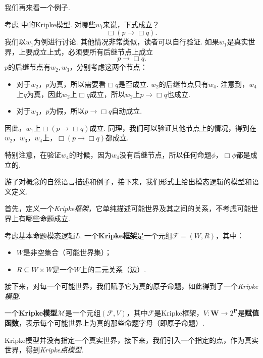 我们再来看一个例子. 

\begin{example}\label{ex:kripke-model-basic}
考虑 中的Kripke模型. 对哪些$w_i$来说，下式成立？
\[\Box (p\to\Box q).\]
我们以$w_1$为例进行讨论. 其他情况非常类似，读者可以自行验证. 如果$w_1$是真实世界，上要成立上式，必须要所有后继节点上成立
    \[p\to\Box q.\]
$p$的后继节点有$w_2,w_3$，分别考虑这两个节点：
\begin{itemize}
    \item 对于$w_2$，$p$为真，所以需要看$\Box q$是否成立. $w_2$的后继节点只有$w_4$. 注意到，$w_4$上$q$为真，因此$w_2$上$\Box q$成立，所以$w_2$上$p\to\Box q$也成立. 
    \item 对于$w_3$，$p$为假，所以$p\to\Box q$自动成立. 
\end{itemize}
因此，$w_1$上$\Box (p\to\Box q)$成立. 同理，我们可以验证其他节点上的情况，得到在$w_2$，$w_3$，$w_4$上，$\Box (p\to\Box q)$都成立. 

特别注意，在验证$w_4$的时候，因为$w_4$没有后继节点，所以任何命题$\phi$，$\Box\phi$都是成立的. 
\end{example}

游了对概念的自然语言描述和例子，接下来，我们形式上给出模态逻辑的模型和语义定义. 

首先，定义一个\textit{Kripke框架}，它单纯描述可能世界及其之间的关系，不考虑可能世界上有哪些命题成立. 

\begin{definition}[Kripke框架]
考虑基本命题模态逻辑$L$. 一个\textbf{Kripke框架}是一个元组$\mathcal F=(W,R)$，其中：
\begin{itemize}
\item $W$是非空集合（可能世界集）；
\item $R\subseteq W\times W$是一个$W$上的二元关系（边）. 
\end{itemize}
\end{definition}

接下来，对每一个可能世界，我们赋予它为真的原子命题，如此得到了一个\textit{Kripke模型}. 

\begin{definition}[Kripke模型]
一个\textbf{Kripke模型}$\mathcal{M}$是一个元组$(\mathcal F,V)$，其中$\mathcal F$是Kripke框架，$V:\mathbf W\to 2^{\mathbf P}$是\textbf{赋值函数}，表示每个可能世界上为真的那些命题字母（即原子命题）. 
\end{definition}

Kripke模型并没有指定一个真实世界，接下来，我们引入一个指定的点，作为真实世界，得到\textit{Kripke点模型}. 

